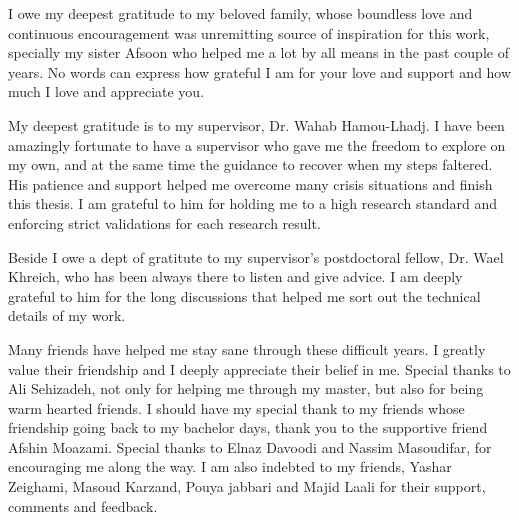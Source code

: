 I owe my deepest gratitude to my beloved family, whose
boundless love and continuous encouragement was unremitting source of inspiration
for this work, specially my sister Afsoon who helped me a lot by all means in the past couple of years.  No words can express how grateful I am for your love and support and
how much I love and appreciate you.

My deepest gratitude is to my supervisor, Dr. Wahab Hamou-Lhadj. I have been amazingly fortunate to have a supervisor who gave me the freedom to explore on my own, and at the same time the guidance to recover when my steps faltered. His patience and support helped me overcome many crisis situations and finish this thesis. I am grateful to him for holding me to a high research standard and enforcing strict validations for each research result.

Beside I owe a dept of gratitute to my supervisor's postdoctoral fellow, Dr. Wael Khreich, who has been always there to listen and give advice. I am deeply grateful to him for the long discussions that helped me sort out the technical details of my work. 

Many friends have helped me stay sane through these difficult years. I greatly value their friendship and I deeply appreciate their belief in me. Special thanks to Ali Sehizadeh, not only for helping me through my master, but also for being warm hearted friends. I should have my special thank to my friends whose friendship going back to my bachelor days, thank you to the supportive friend Afshin Moazami.
Special thanks to Elnaz Davoodi and Nassim Masoudifar, for encouraging me along the way.
I am also indebted to my friends, Yashar Zeighami, Masoud Karzand, Pouya jabbari and Majid Laali for their support, comments and feedback.

